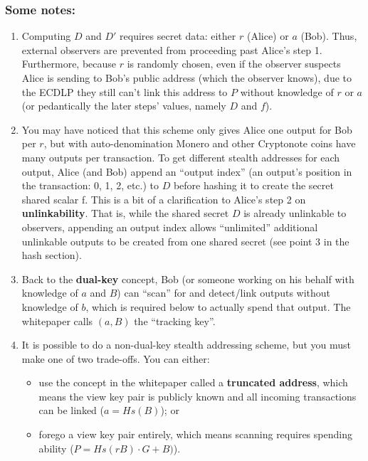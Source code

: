 \subsubsection{Some notes:}
	\begin{enumerate}
		\item Computing \(D\) and \(D'\) requires secret data: either \(r\) (Alice) or \(a\) (Bob). Thus, external observers are prevented from proceeding past Alice's step 1. Furthermore, because \(r\) is randomly chosen, even if the observer suspects Alice is sending to Bob's public address (which the observer knows), due to the ECDLP they still can't link this address to \(P\) without knowledge of \(r\) or \(a\) (or pedantically the later steps' values, namely \(D\) and \(f\)).
		\item You may have noticed that this scheme only gives Alice one output for Bob per \(r\), but with auto-denomination Monero and other Cryptonote coins have many outputs per transaction. To get different stealth addresses for each output, Alice (and Bob) append an ``output index'' (an output's position in the transaction: 0, 1, 2, etc.) to \(D\) before hashing it to create the secret shared scalar f. This is a bit of a clarification to Alice's step 2 on \textbf{unlinkability}. That is, while the shared secret \(D\) is already unlinkable to observers, appending an output index allows ``unlimited'' additional unlinkable outputs to be created from one shared secret (see point 3 in the hash section).
		\item Back to the \textbf{dual-key} concept, Bob (or someone working on his behalf with knowledge of \(a\) and \(B\)) can ``scan'' for and detect/link outputs without knowledge of \(b\), which is required below to actually spend that output. The whitepaper calls \((a,B)\) the ``tracking key''.
		\item It is possible to do a non-dual-key stealth addressing scheme, but you must make one of two trade-offs. You can either: 
			\begin{itemize}
				\item use the concept in the whitepaper called a \textbf{truncated address}, which means the view key pair is publicly known and all incoming transactions can be linked (\(a = Hs(B)\)); or 
				\item forego a view key pair entirely, which means scanning requires spending ability (\(P = Hs(rB)\cdot G + B)\)).
			\end{itemize}
	\end{enumerate}
